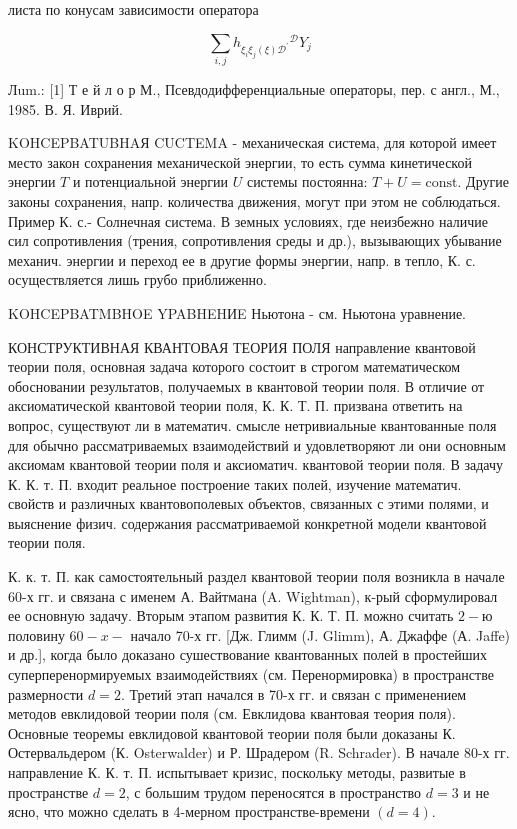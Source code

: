 \documentclass[10pt]{article}
\begin{document}
листа по конусам зависимости оператора



\[

\sum_{i, j} h_{\xi_{i} \xi_{j}(\xi) \mathscr{D}^{\prime}}{ }^{\mathscr{D}} Y_{j}

\]



Лum.: [1] Т е й л о р М., Псевдодифференциальные операторы, пер. с англ., М., 1985. В. Я. Иврий.



KOHCEPBATUBHAЯ CUCTEMA - механическая система, для которой имеет место закон сохранения механической энергии, то есть сумма кинетической энергии $T$ и потенциальной энергии $U$ системы постоянна: $T+U=\mathrm{const}$. Другие законы сохранения, напр. количества движения, могут при этом не соблюдаться. Пример К. с.- Солнечная система. В земных условиях, где неизбежно наличие сил сопротивления (трения, сопротивления среды и др.), вызывающих убывание механич. энергии и переход ее в другие формы энергии, напр. в тепло, К. с. осуществляется лишь грубо приближенно.



KOHCEPBATMBHOE YPABHEHИE Ньютона - см. Ньютона уравнение.



КОНСТРУКТИВНАЯ КВАНТОВАЯ ТЕОРИЯ ПОЛЯ направление квантовой теории поля, основная задача которого состоит в строгом математическом обосновании результатов, получаемых в квантовой теории поля. В отличие от аксиоматической квантовой теории поля, К. К. Т. П. призвана ответить на вопрос, существуют ли в математич. смысле нетривиальные квантованные поля для обычно рассматриваемых взаимодействий и удовлетворяют ли они основным аксиомам квантовой теории поля и аксиоматич. квантовой теории поля. В задачу К. К. т. П. входит реальное построение таких полей, изучение математич. свойств и различных квантовополевых объектов, связанных с этими полями, и выяснение физич. содержания рассматриваемой конкретной модели квантовой теории поля.



К. к. т. П. как самостоятельный раздел квантовой теории поля возникла в начале 60-х гг. и связана с именем А. Вайтмана (A. Wightman), к-рый сформулировал ее основную задачу. Вторым этапом развития К. К. Т. П. можно считать $2-ю$ половину $60-x-$ начало 70-х гг. [Дж. Глимм (J. Glimm), А. Джаффе (А. Jaffe) и др.], когда было доказано сушествование квантованных полей в простейших суперперенормируемых взаимодействиях (см. Перенормировка) в пространстве размерности $d=2$. Третий этап начался в 70-х гг. и связан с применением методов евклидовой теории поля (см. Евклидова квантовая теория поля). Основные теоремы евклидовой квантовой теории поля были доказаны К. Остервальдером (К. Osterwalder) и Р. Шрадером (R. Schrader). В начале 80-х гг. направление К. К. т. П. испытывает кризис, поскольку методы, развитые в пространстве $d=2$, с большим трудом переносятся в пространство $d=3$ и не ясно, что можно сделать в 4-мерном пространстве-времени $(d=4)$.
\end{document}
